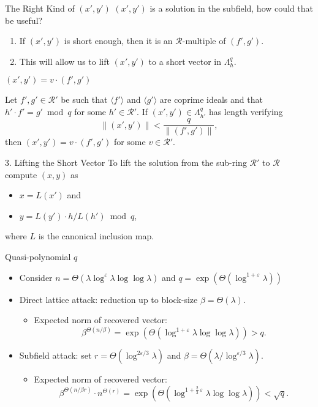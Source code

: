 \documentclass[presentation,smaller]{beamer}
\newcommand{\cR}{\ensuremath{\mathcal{R}}\xspace}
\begin{document}
\begin{frame}[label={sec:org464299a}]{The Right Kind of \((x',y')\)}
\((x',y')\) is a solution in the subfield, how could that be useful?

\pause

\begin{enumerate}
\item If \((x',y')\) is short enough, then it is an \(\cR\)-multiple of \((f',g')\).
\item This will allow us to lift \((x',y')\) to a short vector in \(\Lambda^q_h\).
\end{enumerate}
\end{frame}


\begin{frame}[label={sec:org8755ef8}]{\((x',y') = v ⋅ (f',g')\)}
\begin{theorem}
Let \(f',g' \in \cR'\) be such that \(⟨ f'⟩\) and \(⟨ g'⟩\) are coprime ideals and that \(h'⋅ f' = g' \bmod q\) for some \(h' \in \cR'\). If \((x',y') \in Λ_{h'}^q\) has length verifying
\[\|(x',y') \| < \frac q {\|(f',g')\|},\]
then \((x',y') = v ⋅ (f',g')\) for some \(v ∈ \cR'\).
\end{theorem}
\end{frame}

\begin{frame}[label={sec:org8205f84}]{3. Lifting the Short Vector}
To lift the solution from the sub-ring \(\cR'\) to \(\cR\) compute \((x,y)\) as
\begin{itemize}
\item \(x = L(x')\)  and
\item \(y = L(y') ⋅ h / L(h') \bmod q\),
\end{itemize}
where \(L\) is the canonical inclusion map.
\end{frame}

\begin{frame}[label={sec:orga308dbe}]{Quasi-polynomial \(q\)}
\begin{itemize}[<+->]
\item Consider \(n = \Theta\left( λ \log^ε λ \log\log λ \right)\) and \(q = \exp(\Theta({\log^{1+ε} λ}))\)

\item \alert{Direct lattice attack}: reduction up to block-size \(\beta = \Theta(λ)\).

\begin{itemize}
\item Expected norm of recovered vector: \[β^{\Theta(n/β)} = \exp\left(\Theta\left( \log^{1+ε}λ \log\log λ \right)\right) > q.\]
\end{itemize}

\item \alert{Subfield attack}: set \(r = Θ(\log^{2ε/3} λ)\) and \(β = Θ(λ / \log^{ε/3} λ)\).

\begin{itemize}
\item Expected norm of recovered vector:  \[ β^{Θ(n/β r)} \cdot n^{Θ(r)} = \exp\left(Θ\left(\log^{1+ \frac{2}{3}\,ε}{λ} \log\log λ\right) \right) < \sqrt q.\]
\end{itemize}
\end{itemize}
\end{frame}
\end{document}
